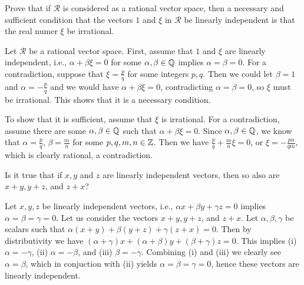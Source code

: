 \begin{problem}
  Prove that if $\mathcal{R}$ is considered as a rational vector space, then a necessary and sufficient condition that the vectors $1$ and $\xi$ in $\mathcal{R}$ be linearly independent is that the real numer $\xi$ be irrational.
\end{problem}

\begin{solution}
  Let $\mathcal{R}$ be a rational vector space.
  First, assume that $1$ and $\xi$ are linearly independent, i.e., $\alpha + \beta \xi = 0$ for some $\alpha, \beta \in \mathbb{Q}$ implies $\alpha = \beta = 0$.
  For a contradiction, suppose that $\xi = \frac{p}{q}$ for some integers $p, q$.
  Then we could let $\beta = 1$ and $\alpha = -\frac{p}{q}$ and we would have $\alpha + \beta \xi = 0$, contradicting $\alpha = \beta = 0$, so $\xi$ must be irrational.
  This shows that it is a necessary condition.

  To show that it is sufficient, assume that $\xi$ is irrational.
  For a contradiction, assume there are some $\alpha, \beta \in \mathbb{Q}$ such that $\alpha + \beta \xi = 0$.
  Since $\alpha, \beta \in \mathbb{Q}$, we know that $\alpha = \frac{p}{q}$, $\beta = \frac{m}{n}$ for some $p, q, m, n \in \mathbb{Z}$.
  Then we have $\frac{p}{q} + \frac{m}{n} \xi = 0$, or $\xi = -\frac{pn}{qm}$, which is clearly rational, a contradiction.
\end{solution}

\begin{problem}
  Is it true that if $x, y$ and $z$ are linearly independent vectors, then so also are $x + y, y + z$, and $z + x$?
\end{problem}

\begin{solution}
  Let $x, y, z$ be linearly independent vectors, i.e., $\alpha x + \beta y + \gamma z = 0$ implies $\alpha = \beta = \gamma = 0$.
  Let us consider the vectors $x + y, y + z$, and $z + x$.
  Let $\alpha, \beta, \gamma$ be scalars such that $\alpha(x + y) + \beta(y + z) + \gamma(z + x) = 0$.
  Then by distributivity we have $(\alpha + \gamma)x + (\alpha + \beta)y + (\beta + \gamma)z = 0$.
  This implies (i) $\alpha = -\gamma$, (ii) $\alpha = -\beta$, and (iii) $\beta = -\gamma$.
  Combining (i) and (iii) we clearly see $\alpha = \beta$, which in conjuction with (ii) yields $\alpha = \beta = \gamma = 0$, hence these vectors are linearly independent.
\end{solution}

